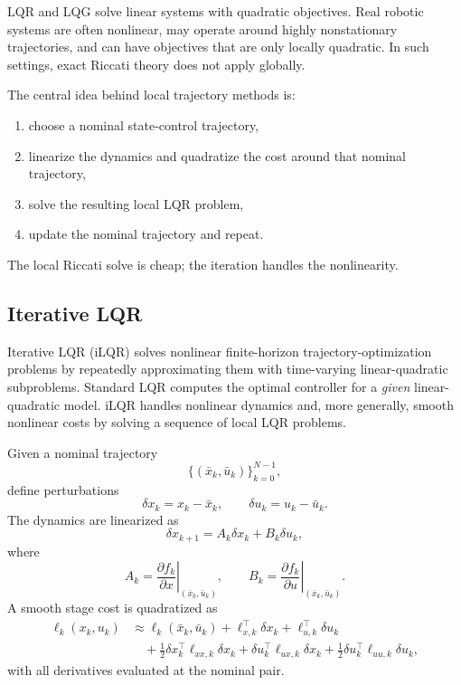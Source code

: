 \begin{remark}
	LQR and LQG solve linear systems with quadratic objectives. Real robotic systems are often nonlinear, may operate around highly nonstationary trajectories, and can have objectives that are only locally quadratic. In such settings, exact Riccati theory does not apply globally.
\end{remark}

\begin{intuition}
	The central idea behind local trajectory methods is:
	\begin{enumerate}[label=(\alph*)]
		\item choose a nominal state-control trajectory,
		\item linearize the dynamics and quadratize the cost around that nominal trajectory,
		\item solve the resulting local LQR problem,
		\item update the nominal trajectory and repeat.
	\end{enumerate}
	The local Riccati solve is cheap; the iteration handles the nonlinearity.
\end{intuition}

\subsection{Iterative LQR}
\label{sec:l8-iterative-lqr}

\begin{definition}\label{def:l8-what-ilqr-solves}
	Iterative LQR (iLQR) solves nonlinear finite-horizon trajectory-optimization problems by repeatedly approximating them with time-varying linear-quadratic subproblems. Standard LQR computes the optimal controller for a \emph{given} linear-quadratic model. iLQR handles nonlinear dynamics and, more generally, smooth nonlinear costs by solving a sequence of local LQR problems.
\end{definition}

\begin{definition}\label{def:l8-linearization-and-quadratization-about-a-nominal-trajectory}
	Given a nominal trajectory
	\[
		\{(\bar x_k,\bar u_k)\}_{k=0}^{N-1},
	\]
	define perturbations
	\[
		\delta x_k = x_k-\bar x_k,
		\qquad
		\delta u_k = u_k-\bar u_k.
	\]
	The dynamics are linearized as
	\[
		\delta x_{k+1}=A_k \delta x_k + B_k \delta u_k,
	\]
	where
	\[
		A_k = \left.\frac{\partial f_k}{\partial x}\right|_{(\bar x_k,\bar u_k)},
		\qquad
		B_k = \left.\frac{\partial f_k}{\partial u}\right|_{(\bar x_k,\bar u_k)}.
	\]
	A smooth stage cost is quadratized as
	\begin{align*}
		\ell_k(x_k,u_k)
		&\approx
		\ell_k(\bar x_k,\bar u_k)
		+
		\ell_{x,k}^\top \delta x_k
		+
		\ell_{u,k}^\top \delta u_k \\
		&\quad
		+
		\frac{1}{2}\delta x_k^\top \ell_{xx,k}\delta x_k
		+
		\delta u_k^\top \ell_{ux,k}\delta x_k
		+
		\frac{1}{2}\delta u_k^\top \ell_{uu,k}\delta u_k,
	\end{align*}
	with all derivatives evaluated at the nominal pair.
\end{definition}

